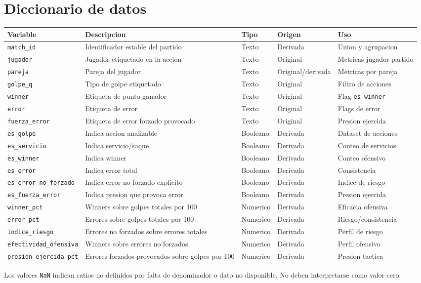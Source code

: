 \section{Diccionario de datos}

\begin{longtable}{p{} p{} p{} p{} p{}}
\hline
\textbf{Variable} & \textbf{Descripcion} & \textbf{Tipo} & \textbf{Origen} & \textbf{Uso} \\
\hline
\endhead
\texttt{match\_id} & Identificador estable del partido & Texto & Derivada & Union y agrupacion \\
\texttt{jugador} & Jugador etiquetado en la accion & Texto & Original & Metricas jugador-partido \\
\texttt{pareja} & Pareja del jugador & Texto & Original/derivada & Metricas por pareja \\
\texttt{golpe\_q} & Tipo de golpe etiquetado & Texto & Original & Filtro de acciones \\
\texttt{winner} & Etiqueta de punto ganador & Texto & Original & Flag \texttt{es\_winner} \\
\texttt{error} & Etiqueta de error & Texto & Original & Flags de error \\
\texttt{fuerza\_error} & Etiqueta de error forzado provocado & Texto & Original & Presion ejercida \\
\texttt{es\_golpe} & Indica accion analizable & Booleano & Derivada & Dataset de acciones \\
\texttt{es\_servicio} & Indica servicio/saque & Booleano & Derivada & Conteo de servicios \\
\texttt{es\_winner} & Indica winner & Booleano & Derivada & Conteo ofensivo \\
\texttt{es\_error} & Indica error total & Booleano & Derivada & Consistencia \\
\texttt{es\_error\_no\_forzado} & Indica error no forzado explicito & Booleano & Derivada & Indice de riesgo \\
\texttt{es\_fuerza\_error} & Indica presion que provoca error & Booleano & Derivada & Presion ejercida \\
\texttt{winner\_pct} & Winners sobre golpes totales por 100 & Numerico & Derivada & Eficacia ofensiva \\
\texttt{error\_pct} & Errores sobre golpes totales por 100 & Numerico & Derivada & Riesgo/consistencia \\
\texttt{indice\_riesgo} & Errores no forzados sobre errores totales & Numerico & Derivada & Perfil de riesgo \\
\texttt{efectividad\_ofensiva} & Winners sobre errores no forzados & Numerico & Derivada & Perfil ofensivo \\
\texttt{presion\_ejercida\_pct} & Errores forzados provocados sobre golpes por 100 & Numerico & Derivada & Presion tactica \\
\hline
\end{longtable}

Los valores \texttt{NaN} indican ratios no definidos por falta de denominador o dato no disponible. No deben interpretarse como valor cero.

